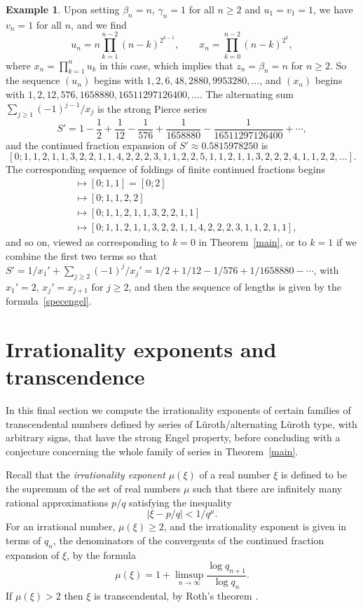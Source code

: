 \documentclass[12pt,a4paper]{amsart}
\theoremstyle{definition}
\newtheorem{example}[theorem]{Example}
\numberwithin{equation}{section}
\newcommand\bet{{\beta}}
\newcommand\gam{{\gamma}}
\begin{document}
\begin{example}
\label{zjisj}
Upon setting $\bet_n=n$, $\gam_n=1$ for all $n\geq 2$ and $u_1=v_1=1$, we have 
$v_n=1$ for all $n$, and we find 
\[ 
u_n=n\prod_{k=1}^{n-2}(n-k)^{2^{k-1}}, \qquad 
x_n = \prod_{k=0}^{n-2}(n-k)^{2^{k}},
\] 
where $x_n=\prod_{k=1}^nu_k$ in this case, 
which implies that $z_n=\bet_n=n$ for $n\geq 2$. So the sequence $(u_n)$ begins 
with $1,2,6,48,2880,9953280,\ldots$, and 
$(x_n)$ begins with $1,2,12,576,1658880,16511297126400,\ldots$. The 
alternating sum $\sum_{j\geq 1}(-1)^{j-1}/x_j$ is the strong Pierce series 
\begin{equation}
\label{expo2}
S'=1-\frac{1}{2}+\frac{1}{12}-\frac{1}{576}+\frac{1}{1658880}-\frac{1}{16511297126400}+\cdots, 
\end{equation} 
and the continued fraction expansion of $S'\approx 0.5815978250$ is 
\small 
\[ 
[0;1,1,2,1,1,3,2,2,1,1,4,2,2,2,3,1,1,2,2,5,1,1,2,1,1,3,2,2,2,4,1,1,2,2,\ldots].
\]
\normalsize 
The corresponding sequence of foldings of finite continued fractions begins 
\begin{align*}
[1] & \mapsto [0;1,1] = [0;2] \\ 
& \mapsto [0;1,1,2,2] \\ 
& \mapsto [0;1,1,2,1,1,3,2,2,1,1] \\ 
& \mapsto [0;1,1,2,1,1,3,2,2,1,1,4,2,2,2,3,1,1,2,1,1], 
\end{align*} 
and so on, viewed as corresponding to $k=0$ in Theorem~\ref{main}, or to $k=1$ if we combine 
the first two terms so that $S'=1/x_1'+\sum_{j\geq 2}(-1)^j/x_j'=1/2 + 1/12-1/576+1/1658880-\cdots$, 
with $x_1'=2$, $x_j'=x_{j+1}$ for $j\geq 2$, and then the sequence 
of lengths is given by the formula~\eqref{specengel}. 
\end{example}

\section{Irrationality exponents and transcendence} 

In this final section we compute the irrationality exponents of certain families of transcendental 
numbers defined by series of L\"uroth/alternating L\"uroth type, with arbitrary signs, that have the strong Engel 
property, before concluding with a conjecture concerning the whole family of series in Theorem~\ref{main}. 

Recall that the \textit{irrationality exponent} $\mu(\xi)$ of a real number $\xi$ is defined to be the 
supremum of the set of real numbers $\mu$ such that there are infinitely many 
rational approximations $p/q$ satisfying the inequality 
\[
|\xi - p/q| < 1/q^\mu.
\] 
For an irrational number, $\mu(\xi)\geq 2$, and 
the irrationality exponent is given in terms of $q_n$, the denominators of the convergents 
of the continued fraction expansion of $\xi$, by the formula 
\begin{equation}
\label{limsup} 
\mu(\xi) = 1+ \limsup\limits_{n\to\infty} \frac{\log q_{n+1}}{\log q_n}.
\end{equation} 
If $\mu(\xi)>2$ then $\xi$ is transcendental, by Roth's theorem \cite{Roth}. 
\end{document}
